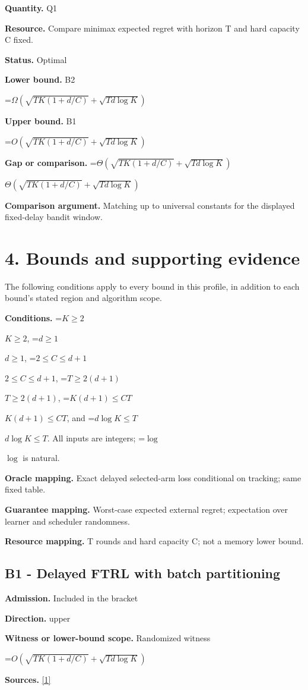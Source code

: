 \documentclass[10pt,a4paper]{article}
\newcommand{\AtlasMath}[1]{\par\begingroup\centering\setbox0=\hbox{$\displaystyle #1$}\ifdim\wd0>1.4\linewidth\typeout{ATLAS WIDE FORMULA: \the\wd0}\fi\ifdim\wd0>\linewidth\resizebox{\linewidth}{!}{\box0}\else\box0\fi\par\endgroup}
\newcommand{\AtlasInlineMath}[1]{\begingroup\setbox0=\hbox{$#1$}\ifdim\wd0>.4\linewidth\endgroup\AtlasMath{#1}\else\endgroup$#1$\fi}
\begin{document}
\textbf{Quantity.} Q1

\textbf{Resource.} Compare minimax expected regret with horizon T and hard capacity C fixed.

\textbf{Status.} Optimal

\textbf{Lower bound.} B2

\AtlasMath{\Omega\!\left(\sqrt{TK(1+d/C)}+\sqrt{Td\log K}\right)}
\textbf{Upper bound.} B1

\AtlasMath{O\!\left(\sqrt{TK(1+d/C)}+\sqrt{Td\log K}\right)}
\textbf{Gap or comparison.} \AtlasInlineMath{\Theta\!\left(\sqrt{TK(1+d/C)}+\sqrt{Td\log K}\right)}

\textbf{Comparison argument.} Matching up to universal constants for the displayed fixed-delay bandit window.

\section{4. Bounds and supporting evidence}
The following conditions apply to every bound in this profile, in addition to each bound's stated region and algorithm scope.

\textbf{Conditions.} \AtlasInlineMath{K\ge2}, \AtlasInlineMath{d\ge1}, \AtlasInlineMath{2\le C\le d+1}, \AtlasInlineMath{T\ge2(d+1)}, \AtlasInlineMath{K(d+1)\le CT}, and \AtlasInlineMath{d\log K\le T}. All inputs are integers; \AtlasInlineMath{\log} is natural.

\textbf{Oracle mapping.} Exact delayed selected-arm loss conditional on tracking; same fixed table.

\textbf{Guarantee mapping.} Worst-case expected external regret; expectation over learner and scheduler randomness.

\textbf{Resource mapping.} T rounds and hard capacity C; not a memory lower bound.

\subsection{B1 - Delayed FTRL with batch partitioning}
\textbf{Admission.} Included in the bracket

\textbf{Direction.} upper

\textbf{Witness or lower-bound scope.} Randomized witness

\AtlasMath{O\!\left(\sqrt{TK(1+d/C)}+\sqrt{Td\log K}\right)}
\textbf{Sources.} \href{https://proceedings.mlr.press/v291/ryabchenko25a.html}{[1]}
\end{document}
